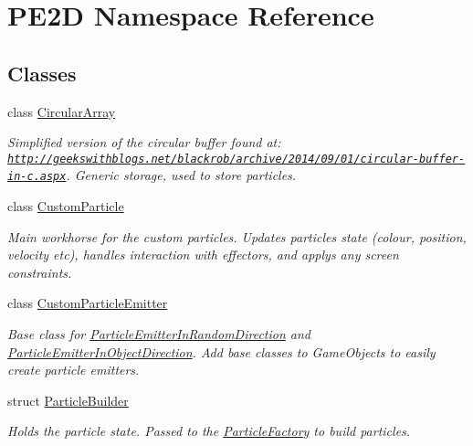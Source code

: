\hypertarget{namespace_p_e2_d}{}\section{P\+E2\+D Namespace Reference}
\label{namespace_p_e2_d}
\subsection*{Classes}
\begin{DoxyCompactItemize}
\item 
class \hyperlink{class_p_e2_d_1_1_circular_array}{Circular\+Array}
\begin{DoxyCompactList}\small\item\em Simplified version of the circular buffer found at\+: \href{http://geekswithblogs.net/blackrob/archive/2014/09/01/circular-buffer-in-c.aspx}{\tt http\+://geekswithblogs.\+net/blackrob/archive/2014/09/01/circular-\/buffer-\/in-\/c.\+aspx}. Generic storage, used to store particles. \end{DoxyCompactList}\item 
class \hyperlink{class_p_e2_d_1_1_custom_particle}{Custom\+Particle}
\begin{DoxyCompactList}\small\item\em Main workhorse for the custom particles. Updates particles state (colour, position, velocity etc), handles interaction with effectors, and applys any screen constraints. \end{DoxyCompactList}\item 
class \hyperlink{class_p_e2_d_1_1_custom_particle_emitter}{Custom\+Particle\+Emitter}
\begin{DoxyCompactList}\small\item\em Base class for \hyperlink{class_p_e2_d_1_1_particle_emitter_in_random_direction}{Particle\+Emitter\+In\+Random\+Direction} and \hyperlink{class_p_e2_d_1_1_particle_emitter_in_object_direction}{Particle\+Emitter\+In\+Object\+Direction}. Add base classes to Game\+Objects to easily create particle emitters. \end{DoxyCompactList}\item 
struct \hyperlink{struct_p_e2_d_1_1_particle_builder}{Particle\+Builder}
\begin{DoxyCompactList}\small\item\em Holds the particle state. Passed to the \hyperlink{class_p_e2_d_1_1_particle_factory}{Particle\+Factory} to build particles. \end{DoxyCompactList}\item 

\end{DoxyCompactItemize}
